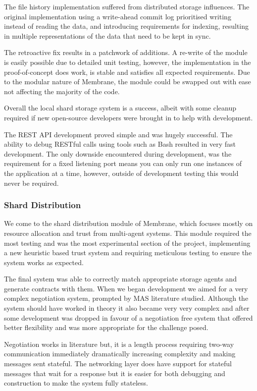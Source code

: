 \documentclass[11pt, a4paper, twocolumn, twoside]{report}
\begin{document}
The file history implementation suffered from distributed storage influences. The original implementation using a write-ahead commit log prioritised writing instead of reading the data, and introducing requirements for indexing, resulting in multiple representations of the data that need to be kept in sync.

The retroactive fix results in a patchwork of additions. A re-write of the module is easily possible due to detailed unit testing, however, the implementation in the proof-of-concept does work, is stable and satisfies all expected requirements. Due to the modular nature of Membrane, the module could be swapped out with ease not affecting the majority of the code.

Overall the local shard storage system is a success, albeit with some cleanup required if new open-source developers were brought in to help with development.

The REST API development proved simple and was hugely successful. The ability to debug RESTful calls using tools such as Bash resulted in very fast development. The only downside encountered during development, was the requirement for a fixed listening port means you can only run one instances of the application at a time, however, outside of development testing this would never be required.

\subsubsection{Shard Distribution}

We come to the shard distribution module of Membrane, which focuses mostly on resource allocation and trust from multi-agent systems. This module required the most testing and was the most experimental section of the project, implementing a new heuristic based trust system and requiring meticulous testing to ensure the system works as expected.

The final system was able to correctly match appropriate storage agents and generate contracts with them. When we began development we aimed for a very complex negotiation system, prompted by MAS literature studied. Although the system should have worked in theory it also became very very complex and after some development was dropped in favour of a negotiation free system that offered better flexibility and was more appropriate for the challenge posed.

Negotiation works in literature but, it is a length process requiring two-way communication immediately dramatically increasing complexity and making messages sent stateful. The networking layer does have support for stateful messages that wait for a response but it is easier for both debugging and construction to make the system fully stateless.
\end{document}
